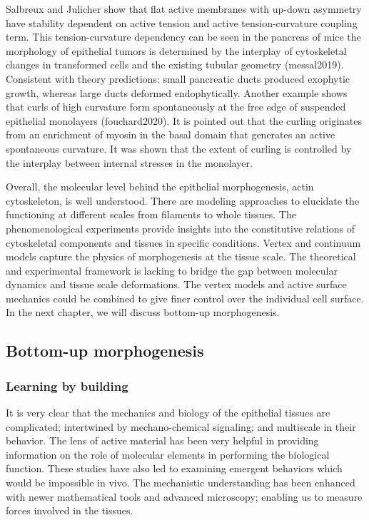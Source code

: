 \documentclass[
]{article}
\begin{document}
Salbreux and Julicher show that flat active membranes with up-down
asymmetry have stability dependent on active tension and active
tension-curvature coupling term. This tension-curvature dependency can
be seen in the pancreas of mice the morphology of epithelial tumors is
determined by the interplay of cytoskeletal changes in transformed cells
and the existing tubular geometry (messal2019). Consistent with theory
predictions: small pancreatic ducts produced exophytic growth, whereas
large ducts deformed endophytically. Another example shows that curls of
high curvature form spontaneously at the free edge of suspended
epithelial monolayers (fouchard2020). It is pointed out that the curling
originates from an enrichment of myosin in the basal domain that
generates an active spontaneous curvature. It was shown that the extent
of curling is controlled by the interplay between internal stresses in
the monolayer.

Overall, the molecular level behind the epithelial morphogenesis, actin
cytoskeleton, is well understood. There are modeling approaches to
elucidate the functioning at different scales from filaments to whole
tissues. The phenomenological experiments provide insights into the
constitutive relations of cytoskeletal components and tissues in
specific conditions. Vertex and continuum models capture the physics of
morphogenesis at the tissue scale. The theoretical and experimental
framework is lacking to bridge the gap between molecular dynamics and
tissue scale deformations. The vertex models and active surface
mechanics could be combined to give finer control over the individual
cell surface. In the next chapter, we will discuss bottom-up
morphogenesis.

\hypertarget{bottom-up-morphogenesis-1}{%
\subsection{Bottom-up morphogenesis}\label{bottom-up-morphogenesis-1}}

\hypertarget{learning-by-building}{%
\subsubsection{Learning by building}\label{learning-by-building}}

It is very clear that the mechanics and biology of the epithelial
tissues are complicated; intertwined by mechano-chemical signaling; and
multiscale in their behavior. The lens of active material has been very
helpful in providing information on the role of molecular elements in
performing the biological function. These studies have also led to
examining emergent behaviors which would be impossible in vivo. The
mechanistic understanding has been enhanced with newer mathematical
tools and advanced microscopy; enabling us to measure forces involved in
the tissues.
\end{document}
